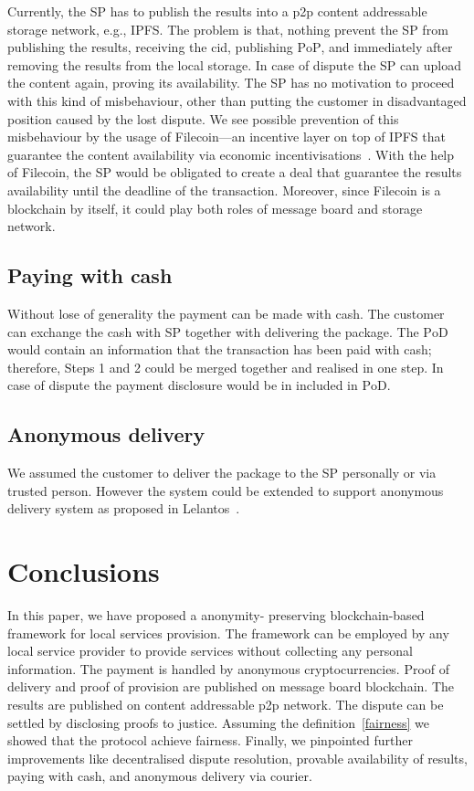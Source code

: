 \documentclass{ieeeaccess}
\begin{document}
Currently, the SP has to publish the results into a p2p content addressable storage network, e.g., IPFS. The problem is that, nothing prevent the SP from publishing the results, receiving the cid, publishing $\mathrm{PoP}$, and immediately after removing the results from the local storage. In case of dispute the SP can upload the content again, proving its availability. The SP has no motivation to proceed with this kind of misbehaviour, other than putting the customer in disadvantaged position caused by the lost dispute. We see possible prevention of this misbehaviour by the usage of Filecoin---an incentive layer on top of IPFS that guarantee the content availability via economic incentivisations~\cite{benetfilecoin}. With the help of Filecoin, the SP would be obligated to create a deal that guarantee the results availability until the deadline of the transaction. Moreover, since Filecoin is a blockchain by itself, it could play both roles of message board and storage network.

\subsection{Paying with cash}\label{paying-with-cash}

Without lose of generality the payment can be made with cash. The customer can exchange the cash with SP together with delivering the package. The $\mathrm{PoD}$ would contain an information that the transaction has been paid with cash; therefore, Steps 1 and 2 could be merged together and realised in one step. In case of dispute the payment disclosure would be in included in $\mathrm{PoD}$.

\subsection{Anonymous delivery}\label{anonymous-delivery}

We assumed the customer to deliver the package to the SP personally or via trusted person. However the system could be extended to support anonymous delivery system as proposed in Lelantos~\cite{altawy2017lelantos}.

\section{Conclusions}\label{sec:conclusion}
In this paper, we have proposed a anonymity- preserving blockchain-based framework for local services provision. The framework can be employed by any local service provider to provide services without collecting any personal information. The payment is handled by anonymous cryptocurrencies. Proof of delivery and proof of provision are published on message board blockchain. The results are published on content addressable p2p network. The dispute can be settled by disclosing proofs to justice. Assuming the definition~\ref{fairness} we showed that the protocol achieve fairness. Finally, we pinpointed further improvements like decentralised dispute resolution, provable  availability of results, paying with cash, and anonymous delivery via courier.



\EOD
\end{document}
